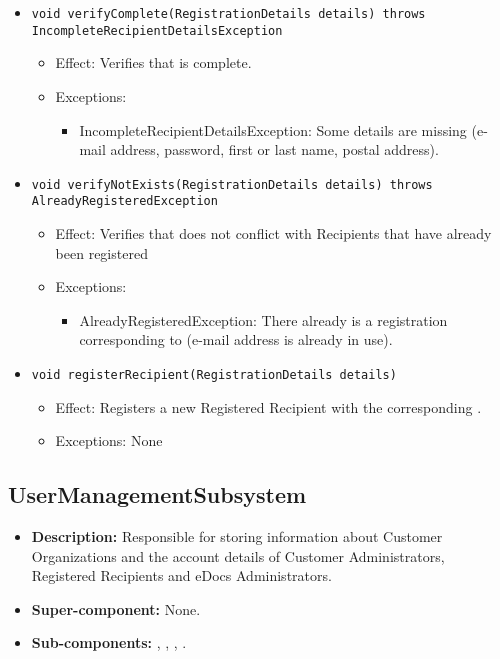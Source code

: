 \begin{itemize}
\begin{itemize}
		\item \texttt{void verifyComplete(RegistrationDetails details) throws IncompleteRecipientDetailsException}
        \begin{itemize}
            \item Effect: Verifies that  is complete.
            \item Exceptions:
			\begin{itemize}
				\item IncompleteRecipientDetailsException: Some details are missing (e-mail address, password, first or last name, postal address).
			\end{itemize}
        \end{itemize}
		
        \item \texttt{void verifyNotExists(RegistrationDetails details) throws AlreadyRegisteredException}
        \begin{itemize}
            \item Effect: Verifies that  does not conflict with Recipients that have already been registered
            \item Exceptions:
			\begin{itemize}
				\item AlreadyRegisteredException: There already is a registration corresponding to  (e-mail address is already in use).
			\end{itemize}
        \end{itemize}

		\item \texttt{void registerRecipient(RegistrationDetails details)}
        \begin{itemize}
            \item Effect: Registers a new Registered Recipient with the corresponding .
            \item Exceptions: None
        \end{itemize}
    \end{itemize}
\end{itemize}

\subsection{UserManagementSubsystem}
\begin{itemize}
    \item \textbf{Description:} Responsible for storing information about Customer Organizations and the account details of Customer Administrators, Registered Recipients and eDocs Administrators.
    \item \textbf{Super-component:} None.
    \item \textbf{Sub-components:} , , , .
\end{itemize}

